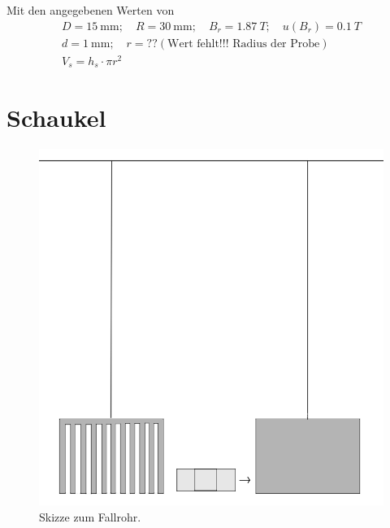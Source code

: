 \documentclass[11pt,a4paper,titlepage, ngerman]{article}
\begin{document}
	Mit den angegebenen Werten von
	\begin{align}
		D = \SI{15}{\milli\meter}; \quad R = \SI{30}{\milli\meter}; \quad B_r = \SI{1,87}{T}; \quad u(B_r) = \SI{0,1}{T}\\
		d = \SI{1}{\milli\meter}; \quad r = ?? (\text{Wert fehlt!!! Radius der Probe})\\
		V_s = h_s \cdot \pi r^2
	\end{align}
	
	\section{Schaukel}
	\begin{figure}[ht]
		\includegraphics[width=\textwidth]{Alu-Platte.png}
		\caption{Skizze zum Fallrohr.}
		\label{fig:schaukel}
	\end{figure}
	
\end{document}
